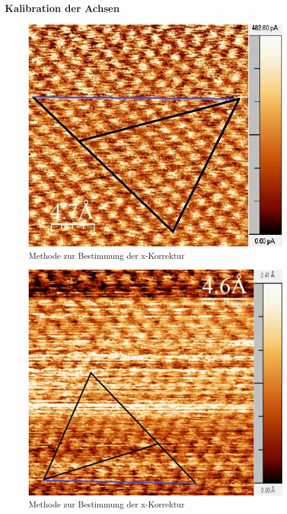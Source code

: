 \documentclass[12pt,a4paper]{article}
\begin{document}
\subsubsection{Kalibration der Achsen}

\begin{figure}
\centering
\includegraphics[scale=0.9]{Bilder/Atome/hoch2_h_scale.jpg}
\caption{Methode zur Bestimmung der x-Korrektur}
\label{fig:hoch2_h}
\end{figure}

\begin{figure}
\centering
\includegraphics[scale=0.54]{Bilder/Atome/strom2_h_scale.jpg}
\caption{Methode zur Bestimmung der x-Korrektur}
\label{fig:strom2_h}
\end{figure}
\end{document}
